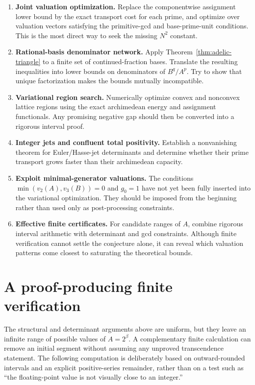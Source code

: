 \documentclass[11pt,oneside]{article}
\theoremstyle{definition}
\theoremstyle{remark}
\begin{document}
\begin{enumerate}
\item \textbf{Joint valuation optimization.}  Replace the componentwise
assignment lower bound by the exact transport cost for each prime, and optimize
over valuation vectors satisfying the primitive-gcd and base-prime-unit
conditions.  This is the most direct way to seek the missing $N^2$ constant.

\item \textbf{Rational-basis denominator network.}  Apply
Theorem~\ref{thm:adelic-triangle} to a finite set of continued-fraction bases.
Translate the resulting inequalities into lower bounds on denominators of
$B^q/A^p$.  Try to show that unique factorization makes the bounds mutually
incompatible.

\item \textbf{Variational region search.}  Numerically optimize convex and
nonconvex lattice regions using the exact archimedean energy and assignment
functionals.  Any promising negative gap should then be converted into a
rigorous interval proof.

\item \textbf{Integer jets and confluent total positivity.}  Establish a
nonvanishing theorem for Euler/Hasse-jet determinants and determine whether
their prime transport grows faster than their archimedean capacity.

\item \textbf{Exploit minimal-generator valuations.}  The conditions
$\min(v_2(A),v_3(B))=0$ and $g_0=1$ have not yet been fully inserted into the
variational optimization.  They should be imposed from the beginning rather
than used only as post-processing constraints.

\item \textbf{Effective finite certificates.}  For candidate ranges of $A$,
combine rigorous interval arithmetic with determinant and gcd constraints.
Although finite verification cannot settle the conjecture alone, it can reveal
which valuation patterns come closest to saturating the theoretical bounds.
\end{enumerate}


\section{A proof-producing finite verification}
\label{sec:finite-verification}

The structural and determinant arguments above are uniform, but they leave an
infinite range of possible values of $A=2^\beta$.  A complementary finite
calculation can remove an initial segment without assuming any unproved
transcendence statement.  The following computation is deliberately based on
outward-rounded intervals and an explicit positive-series remainder, rather
than on a test such as ``the floating-point value is not visually close to an
integer.''
\end{document}
